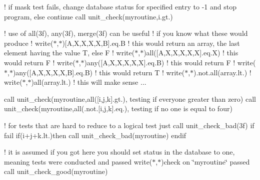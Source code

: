 ! if mask test fails, change database status for specified entry to -\/1 and stop program, else continue call unit\+\_\+check(\textquotesingle{}myroutine\textquotesingle{},i.\+gt.)

! use of all(3f), any(3f), merge(3f) can be useful ! if you know what these would produce ! write($\ast$,$\ast$)\mbox{[}\textquotesingle{}A\textquotesingle{},\textquotesingle{}X\textquotesingle{},\textquotesingle{}X\textquotesingle{},\textquotesingle{}X\textquotesingle{},\textquotesingle{}X\textquotesingle{},\textquotesingle{}B\textquotesingle{}\mbox{]}.eq.\textquotesingle{}B\textquotesingle{} ! this would return an array, the last element having the value T, else F ! write($\ast$,$\ast$)all(\mbox{[}\textquotesingle{}A\textquotesingle{},\textquotesingle{}X\textquotesingle{},\textquotesingle{}X\textquotesingle{},\textquotesingle{}X\textquotesingle{},\textquotesingle{}X\textquotesingle{},\textquotesingle{}X\textquotesingle{}\mbox{]}.eq.\textquotesingle{}X\textquotesingle{}) ! this would return F ! write($\ast$,$\ast$)any(\mbox{[}\textquotesingle{}A\textquotesingle{},\textquotesingle{}X\textquotesingle{},\textquotesingle{}X\textquotesingle{},\textquotesingle{}X\textquotesingle{},\textquotesingle{}X\textquotesingle{},\textquotesingle{}X\textquotesingle{}\mbox{]}.eq.\textquotesingle{}B\textquotesingle{}) ! this would return F ! write($\ast$,$\ast$)any(\mbox{[}\textquotesingle{}A\textquotesingle{},\textquotesingle{}X\textquotesingle{},\textquotesingle{}X\textquotesingle{},\textquotesingle{}X\textquotesingle{},\textquotesingle{}X\textquotesingle{},\textquotesingle{}B\textquotesingle{}\mbox{]}.eq.\textquotesingle{}B\textquotesingle{}) ! this would return T ! write($\ast$,$\ast$).not.\+all(array.\+lt.) ! write($\ast$,$\ast$)all(array.\+lt.) ! this will make sense ...

call unit\+\_\+check(\textquotesingle{}myroutine\textquotesingle{},all(\mbox{[}i,j,k\mbox{]}.gt.), \textquotesingle{}testing if everyone greater than zero\textquotesingle{}) call unit\+\_\+check(\textquotesingle{}myroutine\textquotesingle{},all(.not.\mbox{[}i,j,k\mbox{]}.eq.), \textquotesingle{}testing if no one is equal to four\textquotesingle{})

! for tests that are hard to reduce to a logical test just call unit\+\_\+check\+\_\+bad(3f) if fail if(i+j+k.lt.)then call unit\+\_\+check\+\_\+bad(\textquotesingle{}myroutine\textquotesingle{}) endif

! it is assumed if you got here you should set status in the database to one, meaning tests were conducted and passed write($\ast$,$\ast$)\textquotesingle{}check on \char`\"{}myroutine\char`\"{} passed\textquotesingle{} call unit\+\_\+check\+\_\+good(\textquotesingle{}myroutine\textquotesingle{})


